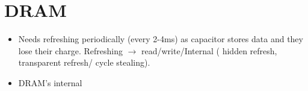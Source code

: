 \section{DRAM}
\begin{itemize}
  \item Needs refreshing periodically (every 2-4ms) as capacitor stores data and they lose their charge. Refreshing $\longrightarrow$ read/write/Internal ( hidden refresh, transparent refresh/ cycle stealing).
  \item DRAM's internal
\end{itemize}
